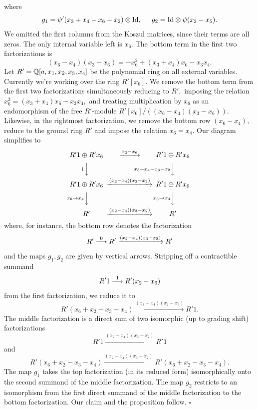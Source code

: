 \documentclass[12pt]{article}
\begin{document}
where 
$$ g_1=\psi'(x_3+x_4-x_6-x_2)\otimes \mathrm{Id}, \hspace{0.2in} 
   g_2= \mathrm{Id} \otimes \psi(x_3-x_5).$$ 
We omitted  the first columns from the Koszul matrices, since their terms 
are all zeros. The only internal variable left is $x_6.$ 
The bottom term in the first two factorizations is 
 $$(x_6-x_4)(x_3-x_6) = - x_6^2 + (x_3 + x_4) x_6 -x_3 x_4.$$ 
Let $R'=\mathbb Q[a,x_1, x_2, x_3,x_4]$ be the polynomial ring on all 
external variables. Currently we're working over the ring 
$R'[x_6].$ We remove the bottom term from the first two 
factorizations simultaneously reducing to $R',$ imposing 
the relation $x_6^2 = (x_3+x_4)x_6 - x_3 x_4,$ and treating 
multiplication by $x_6$ as an endomorphism of the free $R'$-module 
$R'[x_6]/((x_6-x_4)(x_3-x_6)).$ 
Likewise, in the rightmost factorization, we remove the bottom 
row $(x_6-x_4),$ reduce to the ground ring $R'$ and impose the 
relation $x_6=x_4.$ Our diagram simplifies to 
 \begin{equation*}
   \begin{CD}
     R'1\oplus R'x_6  @>{x_2-x_6}>> R'1\oplus R'x_6   \\
     @V{1}VV      @V{x_3+x_4-x_6-x_2}VV  \\
     R'1\oplus R'x_6 @>{(x_2-x_4)(x_3-x_2)}>> R'1\oplus R' x_6 \\
     @V{x_6\to x_4}VV      @V{x_6\to x_4}VV  \\
     R'    @>{(x_2-x_4)(x_3-x_2)}>> R'  
   \end{CD}
 \end{equation*}
where, for instance, the bottom row denotes the factorization 
$$R' \stackrel{0}{\longrightarrow} R' \xrightarrow{ (x_2-x_4)(x_3-x_2)} R' $$
and the maps $g_1, g_2$ are given by vertical arrows.  
Stripping off a contractible summand 
$$ R'1 \stackrel{1}{\longrightarrow} R'(x_2-x_6) $$ 
from the first factorization, we reduce it to 
$$ R'(x_6+x_2-x_3-x_4) \xrightarrow{(x_2-x_4)(x_2-x_3)} R' 1. $$ 
The middle factorization is a direct sum of two isomorphic (up to 
grading shift) factorizations 
$$ R' 1  \xrightarrow{(x_2-x_4)(x_3-x_2)} R' 1$$
and 
$$ R'(x_6+x_2-x_3-x_4) \xrightarrow{(x_2-x_4)(x_3-x_2)} 
 R'(x_6+x_2-x_3-x_4).$$ 
The map $g_1$ takes the top factorization (in its reduced form)
isomorphically onto the second summand of the middle factorization. 
The map $g_2$ restricts to an isomorphism from the first direct 
summand of the middle factorization to the bottom factorization. 
Our claim and the proposition follow. $\square$ 

\vspace{0.07in} 
\end{document}
